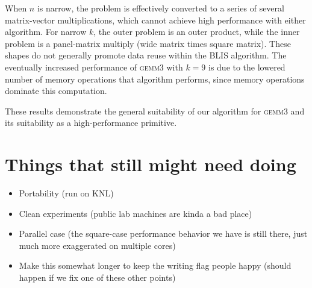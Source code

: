 \documentclass[12pt]{article}
\newcommand*{\gemmt}{{\textsc{gemm3}}}
\begin{document}
When $n$ is narrow, the problem is effectively converted to a series of several matrix-vector multiplications, which cannot achieve high performance with either algorithm.
For narrow $k$, the outer problem is an outer product, while the inner problem is a panel-matrix multiply (wide matrix times square matrix).
These shapes do not generally promote data reuse within the BLIS algorithm.
The eventually increased performance of \gemmt{} with $k = 9$ is due to the lowered number of memory operations that algorithm performs, since memory operations dominate this computation.

These results demonstrate the general suitability of our algorithm for \gemmt{} and its suitability as a high-performance primitive.

\section{Things that still might need doing}
\begin{itemize}
\item Portability (run on KNL)
\item Clean experiments (public lab machines are kinda a bad place)
\item Parallel case (the square-case performance behavior we have is still there, just much more exaggerated on multiple cores)
\item Make this somewhat longer to keep the writing flag people happy (should happen if we fix one of these other points)
\end{itemize}
\printbibliography{}
\end{document}
